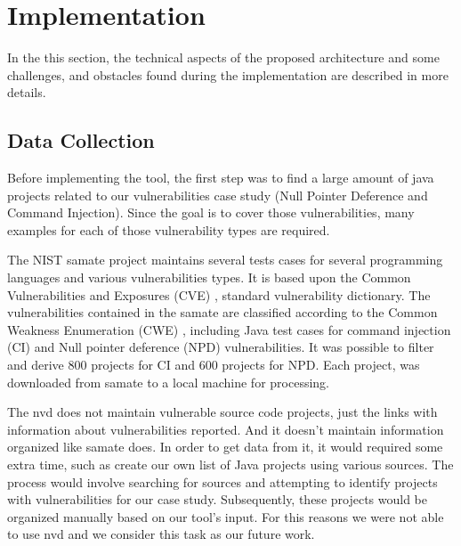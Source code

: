 % 
%  
%

\chapter{Implementation}
\label{cha:Implementation_chapter}

In the this section, the technical aspects of the proposed architecture and some challenges, and obstacles found during the implementation are described in more details.

\section{Data Collection} %
\label{sec:Data_Collection}

Before implementing the tool, the first step was to find a large amount of java projects related to our vulnerabilities case study (Null Pointer Deference and Command Injection). Since the goal is to cover those  vulnerabilities, many examples for each of those vulnerability types are required.

The NIST \gls{samate} project maintains several tests cases for several programming languages and various vulnerabilities types. It is based upon the Common Vulnerabilities and Exposures (CVE) \cite{CVE_2023}, standard vulnerability dictionary. The vulnerabilities contained in the \gls{samate} are classified according to the Common Weakness Enumeration (CWE) \cite{CVE476}, including Java test cases for command injection (CI) and Null pointer deference (NPD) vulnerabilities. It was possible to filter and derive 800 projects for CI and 600 projects for NPD.  Each project, was downloaded from \gls{samate} to a local machine for processing.

The \gls{nvd} does not maintain vulnerable source code projects, just the links with information about vulnerabilities reported. And it doesn't maintain information organized like \gls{samate} does. In order to get data from it, it would required some extra time, such as  create our own list of Java projects using various sources. The process would involve searching for sources and attempting to identify projects with vulnerabilities for our case study. Subsequently, these projects would be organized manually based on our tool's input. For this reasons we were not able to use \gls{nvd} and we consider this task as our future work.



